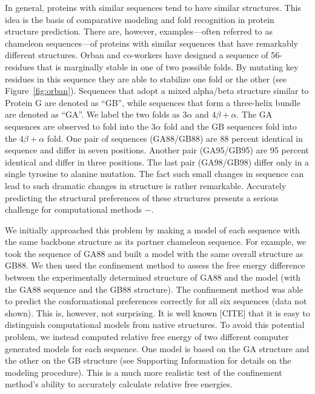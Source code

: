 \documentclass[12pt]{article}
\begin{document}
In general, proteins with similar sequences tend to have similar structures. This idea is the basis
of comparative modeling and fold recognition in protein structure prediction. There are, however,
examples---often referred to as chameleon sequences---of proteins with similar sequences that have
remarkably different structures. Orban and co-workers have designed a sequence of 56-residues that
is marginally stable in one of two possible folds. By mutating key residues in this sequence they
are able to stabilize one fold or the other (see Figure~\ref{fig:orban}). Sequences that adopt a
mixed alpha/beta structure similar to Protein G are denoted as ``GB'', while sequences that form a
three-helix bundle are denoted as ``GA''. We label the two folds as $3 \alpha$ and $4 \beta +
\alpha$. The GA sequences are observed to fold into the $3 \alpha$ fold and the GB sequences fold
into the $4 \beta + \alpha$ fold. One pair of sequences (GA88/GB88) are 88 percent identical in
sequence and differ in seven positions. Another pair (GA95/GB95) are 95 percent identical and differ
in three positions. The last pair (GA98/GB98) differ only in a single tyrosine to alanine mutation.
The fact such small changes in sequence can lead to such dramatic changes in structure is rather
remarkable. Accurately predicting the structural preferences of these structures presents a serious
challenge for computational methods \cite{Alexander2007}$-$\cite{Shortle20009}.

We initially approached this problem by making a model of each sequence with the same backbone
structure as its partner chameleon sequence. For example, we took the sequence of GA88 and built a
model with the same overall structure as GB88. We then used the confinement method to assess the
free energy difference between the experimentally determined structure of GA88 and the model (with
the GA88 sequence and the GB88 structure). The confinement method was able to predict the
conformational preferences correctly for all six sequences (data not shown). This is, however, not
surprising. It is well known [CITE] that it is easy to distinguish computational models from native
structures. To avoid this potential problem, we instead computed relative free energy of two
different computer generated models for each sequence. One model is based on the GA structure and
the other on the GB structure (see Supporting Information for details on the modeling procedure).
This is a much more realistic test of the confinement method's ability to accurately calculate
relative free energies.
\end{document}
